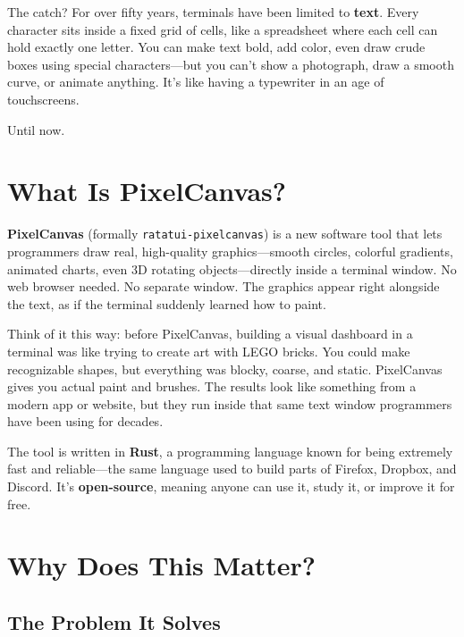 \documentclass[12pt, a4paper]{article}
\begin{document}
The catch? For over fifty years, terminals have been limited to \textbf{text}. Every character sits inside a fixed grid of cells, like a spreadsheet where each cell can hold exactly one letter. You can make text bold, add color, even draw crude boxes using special characters---but you can't show a photograph, draw a smooth curve, or animate anything. It's like having a typewriter in an age of touchscreens.

Until now.

\section{What Is PixelCanvas?}

\textbf{PixelCanvas} (formally \texttt{ratatui-pixelcanvas}) is a new software tool that lets programmers draw real, high-quality graphics---smooth circles, colorful gradients, animated charts, even 3D rotating objects---directly inside a terminal window. No web browser needed. No separate window. The graphics appear right alongside the text, as if the terminal suddenly learned how to paint.

Think of it this way: before PixelCanvas, building a visual dashboard in a terminal was like trying to create art with LEGO bricks. You could make recognizable shapes, but everything was blocky, coarse, and static. PixelCanvas gives you actual paint and brushes. The results look like something from a modern app or website, but they run inside that same text window programmers have been using for decades.

The tool is written in \textbf{Rust}, a programming language known for being extremely fast and reliable---the same language used to build parts of Firefox, Dropbox, and Discord. It's \textbf{open-source}, meaning anyone can use it, study it, or improve it for free.

\section{Why Does This Matter?}

\subsection{The Problem It Solves}
\end{document}
